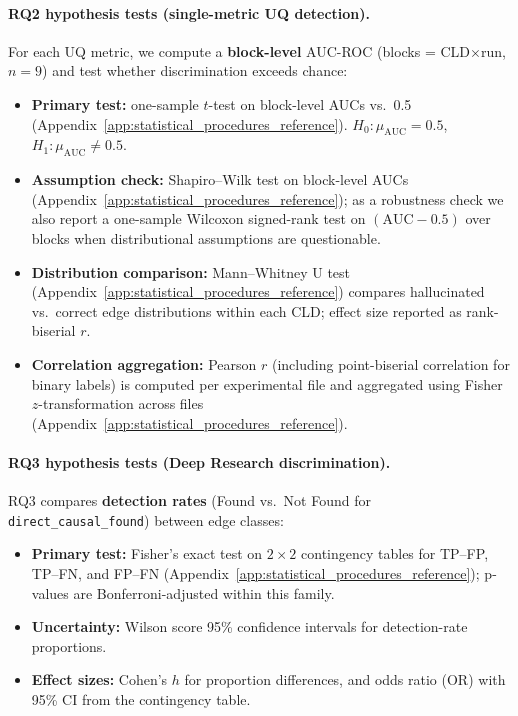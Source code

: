 \paragraph{RQ2 hypothesis tests (single-metric UQ detection).}
For each UQ metric, we compute a \textbf{block-level} AUC-ROC (blocks = CLD$\times$run, $n=9$) and test whether discrimination exceeds chance:
\begin{itemize}[noitemsep]
    \item \textbf{Primary test:} one-sample $t$-test on block-level AUCs vs.\ 0.5 (Appendix~\ref{app:statistical_procedures_reference}). $H_0:\mu_{\text{AUC}}=0.5$, $H_1:\mu_{\text{AUC}}\neq 0.5$.
    \item \textbf{Assumption check:} Shapiro--Wilk test on block-level AUCs (Appendix~\ref{app:statistical_procedures_reference}); as a robustness check we also report a one-sample Wilcoxon signed-rank test on $(\mathrm{AUC}-0.5)$ over blocks when distributional assumptions are questionable.
    \item \textbf{Distribution comparison:} Mann--Whitney U test (Appendix~\ref{app:statistical_procedures_reference}) compares hallucinated vs.\ correct edge distributions within each CLD; effect size reported as rank-biserial $r$.
    \item \textbf{Correlation aggregation:} Pearson $r$ (including point-biserial correlation for binary labels) is computed per experimental file and aggregated using Fisher $z$-transformation across files (Appendix~\ref{app:statistical_procedures_reference}).
\end{itemize}

\paragraph{RQ3 hypothesis tests (Deep Research discrimination).}
RQ3 compares \textbf{detection rates} (Found vs.\ Not Found for \texttt{direct\_causal\_found}) between edge classes:
\begin{itemize}[noitemsep]
    \item \textbf{Primary test:} Fisher's exact test on $2\times2$ contingency tables for TP--FP, TP--FN, and FP--FN (Appendix~\ref{app:statistical_procedures_reference}); p-values are Bonferroni-adjusted within this family.
    \item \textbf{Uncertainty:} Wilson score 95\% confidence intervals for detection-rate proportions.
    \item \textbf{Effect sizes:} Cohen's $h$ for proportion differences, and odds ratio (OR) with 95\% CI from the contingency table.
\end{itemize}


